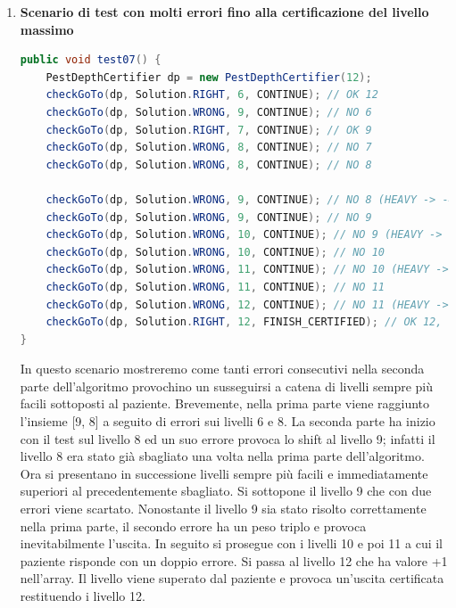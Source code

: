 \documentclass[
	corpo=12pt,
	twoside,
 	evenboxes,
	tipotesi=triennale,
    	stile=classica,
   	 greek,
]{toptesi}
\begin{document}
\begin{enumerate}
\begin{lstlisting}[language=Java, label=lst:debug06, caption={Debug 06}]
[PART ONE] [0,0,0,0,0,0,0,0,0,0,0,1] [CURR:12 RIGHT NEXT:6 L:12 R:1]
[PART ONE] [0,0,0,0,0,1,0,0,0,0,0,1] [CURR:6 RIGHT NEXT:3 L:6 R:1]
[PART ONE] [0,0,-1,0,0,1,0,0,0,0,0,1] [CURR:3 WRONG NEXT:5 L:6 R:3]
[PART ONE] [0,0,-1,0,1,1,0,0,0,0,0,1] [CURR:5 RIGHT NEXT:4 L:5 R:3]
[PART ONE] [0,0,-1,-1,1,1,0,0,0,0,0,1] [CURR:4 WRONG NEXT:4 L:5 R:4]
[PART TWO] [0,0,-1,-4,1,1,0,0,0,0,0,1] [CURR:4 WRONG NEXT:5 L:5 R:4]
[PART TWO] [0,0,-1,-4,2,1,0,0,0,0,0,1] [CURR:5 RIGHT NEXT:5 L:5 R:4]
\end{lstlisting}

\newpage

\item \textbf{Scenario di test con molti errori fino alla certificazione del livello massimo}

\begin{lstlisting}[language=Java, label=lst:test07, caption={Test 07}]
public void test07() {
	PestDepthCertifier dp = new PestDepthCertifier(12);
	checkGoTo(dp, Solution.RIGHT, 6, CONTINUE); // OK 12
	checkGoTo(dp, Solution.WRONG, 9, CONTINUE); // NO 6
	checkGoTo(dp, Solution.RIGHT, 7, CONTINUE); // OK 9
	checkGoTo(dp, Solution.WRONG, 8, CONTINUE); // NO 7
	checkGoTo(dp, Solution.WRONG, 8, CONTINUE); // NO 8
	
	checkGoTo(dp, Solution.WRONG, 9, CONTINUE); // NO 8 (HEAVY -> -4), SHIFT TO 9
	checkGoTo(dp, Solution.WRONG, 9, CONTINUE); // NO 9
	checkGoTo(dp, Solution.WRONG, 10, CONTINUE); // NO 9 (HEAVY -> -3), SHIFT TO 10
	checkGoTo(dp, Solution.WRONG, 10, CONTINUE); // NO 10
	checkGoTo(dp, Solution.WRONG, 11, CONTINUE); // NO 10 (HEAVY -> -4), SHIFT TO 11
	checkGoTo(dp, Solution.WRONG, 11, CONTINUE); // NO 11
	checkGoTo(dp, Solution.WRONG, 12, CONTINUE); // NO 11 (HEAVY -> -4), SHIFT TO 12
	checkGoTo(dp, Solution.RIGHT, 12, FINISH_CERTIFIED); // OK 12, FINISH_CERTIFIED
}
\end{lstlisting}

In questo scenario mostreremo come tanti errori consecutivi nella seconda parte dell'algoritmo provochino un susseguirsi a catena di livelli sempre più facili sottoposti al paziente. Brevemente, nella prima parte viene raggiunto l'insieme [9, 8] a seguito di errori sui livelli 6 e 8. La seconda parte ha inizio con il test sul livello 8 ed un suo errore provoca lo shift al livello 9; infatti il livello 8 era stato già sbagliato una volta nella prima parte dell'algoritmo. Ora si presentano in successione livelli sempre più facili e immediatamente superiori al precedentemente sbagliato. Si sottopone il livello 9 che con due errori viene scartato. Nonostante il livello 9 sia stato risolto correttamente nella prima parte, il secondo errore ha un peso triplo e provoca inevitabilmente l'uscita. In seguito si prosegue con i livelli 10 e poi 11 a cui il paziente risponde con un doppio errore. Si passa al livello 12 che ha valore +1 nell'array. Il livello viene superato dal paziente e provoca un'uscita certificata restituendo i livello 12.


\end{enumerate}
\end{document}
